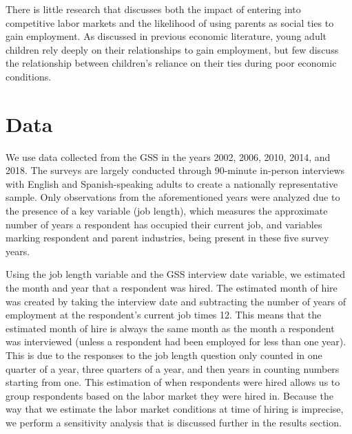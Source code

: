 \documentclass[12pt]{article}
\begin{document}
There is little research that discusses both the impact of entering into competitive labor markets and the likelihood of using parents as social ties to gain employment. As discussed in previous economic literature, young adult children rely deeply on their relationships to gain employment, but few discuss the relationship between children’s reliance on their ties during poor economic conditions.


\section{Data}
\label{sec:data}
We use data collected from the GSS in the years 2002, 2006, 2010, 2014, and 2018. The surveys are largely conducted through 90-minute in-person interviews with English and Spanish-speaking adults to create a nationally representative sample. Only observations from the aforementioned years were analyzed due to the presence of a key variable (job length), which measures the approximate number of years a respondent has occupied their current job, and variables marking respondent and parent industries, being present in these five survey years. 

Using the job length variable and the GSS interview date variable, we estimated the month and year that a respondent was hired. The estimated month of hire was created by taking the interview date and subtracting the number of years of employment at the respondent's current job times 12. This means that the estimated month of hire is always the same month as the month a respondent was interviewed (unless a respondent had been employed for less than one year). This is due to the responses to the job length question only counted in one quarter of a year, three quarters of a year, and then years in counting numbers starting from one. This estimation of when respondents were hired allows us to group respondents based on the labor market they were hired in. Because the way that we estimate the labor market conditions at time of hiring is imprecise, we perform a sensitivity analysis that is discussed further in the results section.
\end{document}
